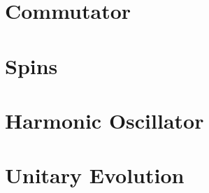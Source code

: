 \documentclass[12pt,letterpaper]{refart}
\begin{document}



\section{Commutator}




\section{Spins}




\section{Harmonic Oscillator}




\section{Unitary Evolution}





\clearpage
\renewcommand*{\bibfont}{\raggedright\normalfont\small}


\end{document}
